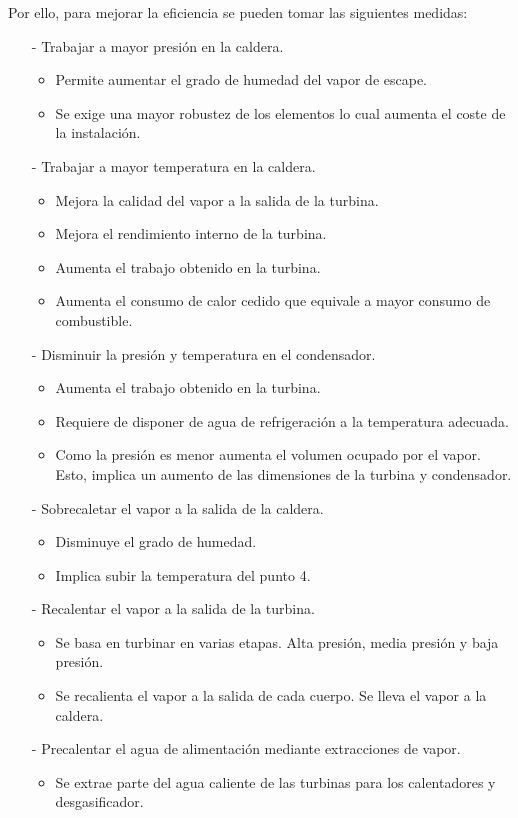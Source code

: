 Por ello, para mejorar la eficiencia se pueden tomar las siguientes medidas:
\begin{itemize}
	\item [-] Trabajar a mayor presión en la caldera. 
	\begin{itemize}
		\item Permite aumentar el grado de humedad del vapor de escape.
		\item Se exige una mayor robustez de los elementos lo cual aumenta el coste de la instalación.
	\end{itemize}
	\item [-] Trabajar a mayor temperatura en la caldera.
	\begin{itemize}
		\item Mejora la calidad del vapor a la salida de la turbina.
		\item Mejora el rendimiento interno de la turbina.
		\item  Aumenta el trabajo obtenido en la turbina.
		\item Aumenta el consumo de calor cedido que equivale a mayor consumo de combustible.
	\end{itemize}
	\item [-] Disminuir la presión y temperatura en el condensador.
	\begin{itemize}
		\item Aumenta el trabajo obtenido en la turbina.
		\item Requiere de disponer de agua de refrigeración a la temperatura adecuada.
		\item Como la presión es menor aumenta el volumen ocupado por el vapor. Esto, implica un aumento de las dimensiones de la turbina y condensador.
	\end{itemize}
	\item [-] Sobrecaletar el vapor a la salida de la caldera.
	\begin{itemize}
		\item Disminuye el grado de humedad.
		\item Implica subir la temperatura del punto 4.
	\end{itemize}
	\item [-] Recalentar el vapor a la salida de la turbina.
	\begin{itemize}
		\item Se basa en turbinar en varias etapas. Alta presión, media presión y baja presión.
		\item Se recalienta el vapor a la salida de cada cuerpo. Se lleva el vapor a la caldera.
	\end{itemize}
	\item [-] Precalentar el agua de alimentación mediante extracciones de vapor. 
	\begin{itemize}
		\item Se extrae parte del agua caliente de las turbinas para los calentadores y desgasificador.
	\end{itemize}
\end{itemize}


